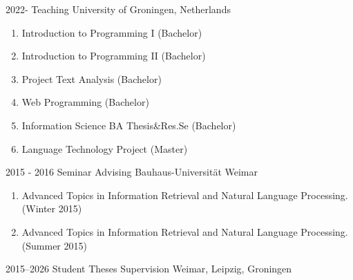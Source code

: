 

\cvevent
{2022-} %
{Teaching} %
{University of Groningen, Netherlands} %
\begin{enumerate}
\item Introduction to Programming I (Bachelor)
\item Introduction to Programming II (Bachelor)
\item Project Text Analysis (Bachelor)
\item Web Programming (Bachelor)
\item Information Science BA Thesis\&Res.Se (Bachelor)
\item Language Technology Project (Master) 
\end{enumerate}
\cvevent
{2015 - 2016} %
{Seminar Advising} %
{Bauhaus-Universität Weimar} %

\begin{enumerate}
\item {Advanced Topics in Information Retrieval and Natural Language Processing. (Winter 2015)}
\item {Advanced Topics in Information Retrieval and Natural Language Processing. (Summer 2015)}
\end{enumerate}


\cvevent
{2015--2026} %
{Student Theses Supervision} %
{Weimar, Leipzig, Groningen} %

